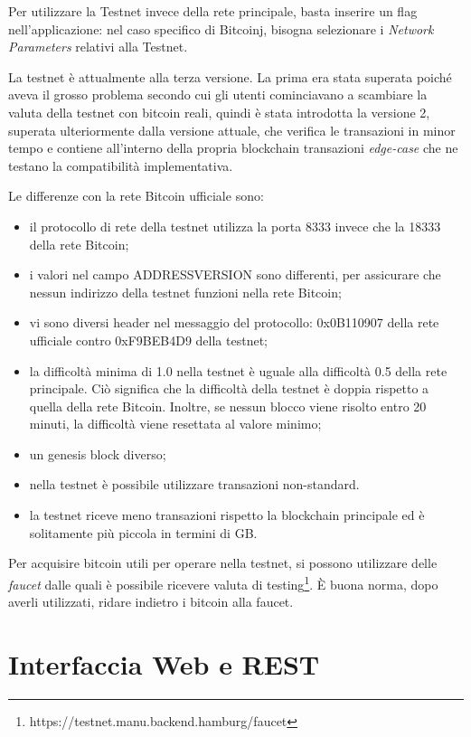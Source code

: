 Per utilizzare la Testnet invece della rete principale, basta inserire un flag nell'applicazione: nel caso specifico di Bitcoinj, bisogna selezionare i \textit{Network Parameters} relativi alla Testnet.

La testnet è attualmente alla terza versione. La prima era stata superata poiché aveva il grosso problema secondo cui gli utenti cominciavano a scambiare la valuta della testnet con bitcoin reali, quindi è stata introdotta la versione 2, superata ulteriormente dalla versione attuale, che verifica le transazioni in minor tempo e contiene all'interno della propria blockchain transazioni \textit{edge-case} che ne testano la compatibilità implementativa.

Le differenze con la rete Bitcoin ufficiale sono:
\begin{itemize}
    \item il protocollo di rete della testnet utilizza la porta 8333 invece che la 18333 della rete Bitcoin;
    \item i valori nel campo ADDRESSVERSION sono differenti, per assicurare che nessun indirizzo della testnet funzioni nella rete Bitcoin;
    \item vi sono diversi header nel messaggio del protocollo: 0x0B110907 della rete ufficiale contro 0xF9BEB4D9 della testnet;
    \item la difficoltà minima di 1.0 nella testnet è uguale alla difficoltà 0.5 della rete principale. Ciò significa che la difficoltà della testnet è doppia rispetto a quella della rete Bitcoin. Inoltre, se nessun blocco viene risolto entro 20 minuti, la difficoltà viene resettata al valore minimo;
    \item un genesis block diverso;
    \item nella testnet è possibile utilizzare transazioni non-standard.
    \item la testnet riceve meno transazioni rispetto la blockchain principale ed è solitamente più piccola in termini di GB.
\end{itemize}

Per acquisire bitcoin utili per operare nella testnet, si possono utilizzare delle \textit{faucet} dalle quali è possibile ricevere valuta di testing\footnote{https://testnet.manu.backend.hamburg/faucet}. È buona norma, dopo averli utilizzati, ridare indietro i bitcoin alla faucet.

\section{Interfaccia Web e REST}
\label{c:integr:webrest}

